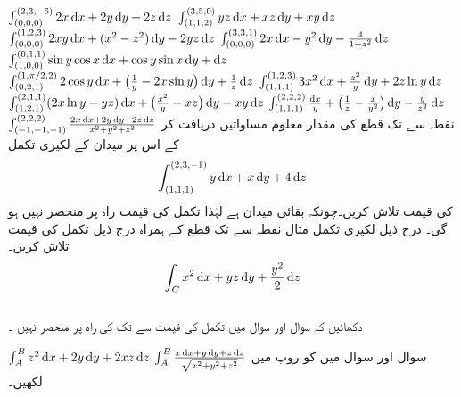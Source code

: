 \(\int_{(0,0,0)}^{(2,3,-6)}2x\dif x+2y\dif y+2z\dif z\)
\(\int_{(1,1,2)}^{(3,5,0)}yz\dif x+xz\dif y+xy\dif z\)
\(\int_{(0,0,0)}^{(1,2,3)}2xy\dif x+(x^2-z^2)\dif y-2yz\dif z\)
\(\int_{(0,0,0)}^{(3,3,1)}2x\dif x-y^2\dif y-\frac{4}{1+z^2}\dif z\)
\(\int_{(1,0,0)}^{(0,1,1)}\sin y\cos x\dif x+\cos y\sin x\dif y+\dif z\)
\(\int_{(0,2,1)}^{(1,\pi/2,2)}2\cos y\dif x+\big(\frac{1}{y}-2x\sin y\big)\dif y+\frac{1}{z}\dif z\)
\(\int_{(1,1,1)}^{(1,2,3)}3x^2\dif x+\frac{z^2}{y}\dif y+2z\ln y\dif z\)
\(\int_{(1,2,1)}^{(2,1,1)}(2x\ln y-yz)\dif x+\big(\frac{x^2}{y}-xz\big)\dif y-xy\dif z\)
\(\int_{(1,1,1)}^{(2,2,2)}\frac{\dif x}{y}+\big(\frac{1}{z}-\frac{x}{y^2}\big)\dif y-\frac{y}{z^2}\dif z\)
\(\int_{(-1,-1,-1)}^{(2,2,2)}\frac{2x\dif x+2y\dif y+2z\dif z}{x^2+y^2+z^2}\)
نقطہ  سے  تک قطع کی مقدار معلوم مساواتیں دریافت کر کے اس پر میدان  کے لکیری تکمل
\begin{align*}
\int_{(1,1,1)}^{(2,3,-1)} y\dif x+x\dif y+4\dif z
\end{align*}
 کی قیمت تلاش کریں۔چونکہ  بقائی میدان ہے لہٰذا تکمل کی قیمت راہ  پر منحصر نہیں ہو گی۔
درج ذیل لکیری تکمل مثال 
نقطہ  سے  تک  قطع  کے ہمراہ درج ذیل تکمل کی قیمت تلاش کریں۔
\begin{align*}
\int_C x^2\dif x+yz\dif y+\frac{y^2}{2}\dif z
\end{align*}
\\
دکھائیں کہ سوال  اور سوال  میں  تکمل کی قیمت      سے  تک  کی راہ پر منحصر نہیں ۔

\(\int_A^Bz^2\dif x+2y\dif y+2xz\dif z\)
\(\int_A^B \frac{x\dif x+y\dif y+z\dif z}{\sqrt{x^2+y^2+z^2}}\)
سوال  اور سوال  میں  کو  روپ میں لکھیں۔

